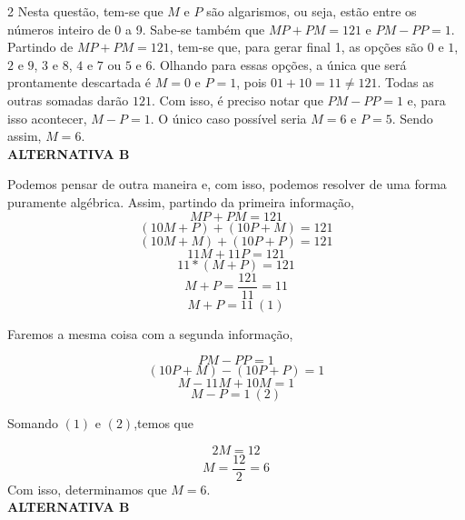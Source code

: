 \begin{solucoes}{2}
    \solucao
Nesta questão, tem-se que $M$ e $P$ são algarismos, ou seja, estão entre os números inteiro de 0 a 9. Sabe-se também que  $MP+PM=121$ e $PM-PP=1$. Partindo de $MP+PM=121$, tem-se que, para gerar final 1, as opções são $0$ e $1$, $2$ e $9$, $3$ e $8$, $4$ e $7$ ou $5$ e $6$. Olhando para essas opções, a única que será prontamente descartada é $M=0$ e $P=1$, pois $01+10=11\neq 121$. Todas as outras somadas darão $121$. Com isso, é preciso notar que $PM-PP=1$ e, para isso acontecer, $M-P=1$. O único caso possível seria $M=6$ e $P=5$. Sendo assim, $M=6$.\\
\textbf{ALTERNATIVA B}

\solucao

Podemos pensar de outra maneira e, com isso, podemos resolver de uma forma puramente algébrica. Assim, partindo da primeira informação, 
\begin{equation*}
MP+PM=121
\end{equation*}
\begin{equation*}
    (10M+P)+(10P+M)=121
\end{equation*}
\begin{equation*}
    (10M+M)+(10P+P)=121
\end{equation*}
\begin{equation*}
    11M+11P=121
\end{equation*}
\begin{equation*}
    11*(M+P)=121
\end{equation*}
\begin{equation*}
    M+P=\frac{121}{11}=11
\end{equation*}
\begin{equation*}
    M+P=11 \ (1)
\end{equation*}

Faremos a mesma coisa com a segunda informação,

\begin{equation*}
    PM-PP=1
\end{equation*}
\begin{equation*}
    (10P+M)-(10P+P)=1
\end{equation*}
\begin{equation*}
    M-11M+10M=1
\end{equation*}
\begin{equation*}
    M-P=1 \ (2)
\end{equation*}

Somando $(1)$ e $(2)$,temos que

\begin{equation*}
  2M=12
\end{equation*}
\begin{equation*}
    M=\frac{12}{2}=6
\end{equation*}
Com isso, determinamos que $M=6$. \\
\textbf{ALTERNATIVA B}
\end{solucoes}

